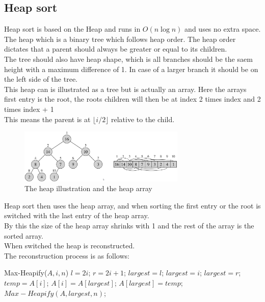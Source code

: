 \documentclass[12pt, a4paper]{article}
\begin{document}
			\subsection{Heap sort}
			\label{sec:HeapSort}
				Heap sort is based on the Heap and runs in $O(n\log n)$ and uses no extra space. The heap which is a binary tree which follows heap order. The heap order dictates that a parent should always be greater or equal to its children. \\
				The tree should also have heap shape, which is all branches should be the saem height with a maximum difference of 1. In case of a larger branch it should be on the left side of the tree.\\
				This heap can is illustrated as a tree but is actually an array. Here the arrays first entry is the root, the roots children will then be at index 2 times index and 2 times index + 1\\
				This means the parent is at $\lfloor i/2 \rfloor$ relative to the child.
				\begin{figure}[h!]
					\includegraphics[width=300px]{assets/heapAsArray.png}
					\center
					\caption{The heap illustration and the heap array}
				\end{figure}
				Heap sort then uses the heap array, and when sorting the first entry or the root is switched with the last entry of the heap array.\\
				By this the size of the heap array shrinks with 1 and the rest of the array is the sorted array.\\
				When switched the heap is reconstructed.\\
				The reconstruction process is as follows:
				\label{code:MaxHeapify}
				\begin{algorithmic}[1]
					\State Max-Heapify($A,i,n$)
					\State $l = 2i$;
					\State $r =2i+1$;
						\State $largest = l$;
					\Else
						\State $largest = i$;
					\EndIf
						\State $largest = r$;
					\EndIf
						\State $temp = A[i]$;
						\State $A[i] = A[largest]$;
						\State $A[largest] = temp$;
						\State $Max-Heapify(A,largest,n)$;
					\EndIf
				\end{algorithmic}
\end{document}
